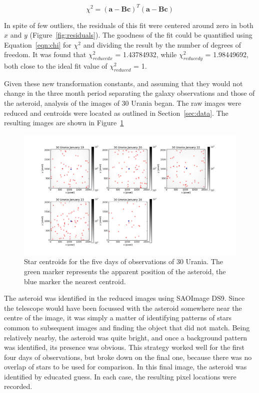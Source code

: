 \documentclass[a4paper,12pt]{article}
\begin{document}
\begin{equation}
\chi ^{2} = (\mathbf{a}-\mathbf{B}\mathbf{c})^{T}(\mathbf{a}-\mathbf{B}\mathbf{c})
\label{eqn:chi}
\end{equation}

In spite of few outliers, the residuals of this fit were centered around zero in both $x$ and $y$ (Figure~\ref{fig:residuals}). The goodness of the fit could be quantified using Equation~\ref{eqn:chi} for $\chi^{2}$ and dividing the result by the number of degrees of freedom. It was found that $\chi^{2}_{reducedx}$ = 1.43784932, while $\chi^{2}_{reducedy}$ = 1.98449692, both close to the ideal fit value of $\chi^{2}_{reduced}$ = 1.

Given these new transformation constants, and assuming that they would not change in the three month period separating the galaxy observations and those of the asteroid, analysis of the images of 30 Urania began. The raw images were reduced and centroids were located as outlined in Section~\ref{sec:data}. The resulting images are shown in Figure~\ref{fig:urania}

\begin{figure}[!htbp]
\centering
\includegraphics[width = \linewidth]{urania_centroid_fix2.png}
\caption{Star centroids for the five days of observations of 30 Urania. The green marker represents the apparent position of the asteroid, the blue marker the nearest centroid.}
\label{fig:urania}
\end{figure}

The asteroid was identified in the reduced images using SAOImage DS9. Since the telescope would have been focussed with the asteroid somewhere near the centre of the image, it was simply a matter of identifying patterns of stars common to subsequent images and finding the object that did not match. Being relatively nearby, the asteroid was quite bright, and once a background pattern was identified, its presence was obvious. This strategy worked well for the first four days of observations, but broke down on the final one, because there was no overlap of stars to be used for comparison. In this final image, the asteroid was identified by educated guess. In each case, the resulting pixel locations were recorded.
\end{document}
